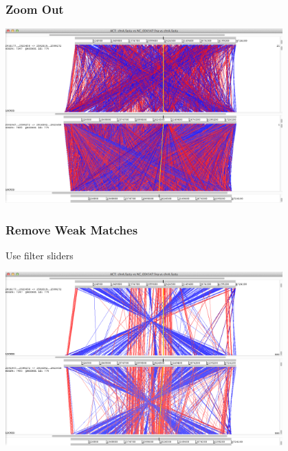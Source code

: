 \begin{frame}
  \frametitle{Zoom Out}
  \begin{center}
    \includegraphics[width=0.8\textwidth]{images/act_wgs6}
  \end{center}
\end{frame}

\begin{frame}
  \frametitle{Remove Weak Matches}
  Use filter sliders
  \begin{center}
    \includegraphics[width=0.8\textwidth]{images/act_wgs7}
  \end{center}
\end{frame}
